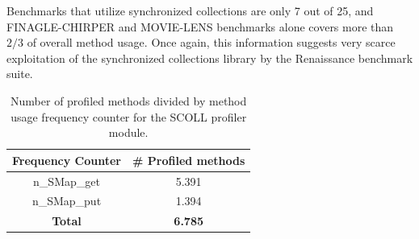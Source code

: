 \documentclass[]{usiinfthesis}
\begin{document}
 Benchmarks that utilize synchronized collections are only 7 out of 25, and FINAGLE-CHIRPER and MOVIE-LENS benchmarks alone covers more than \(2/3\) of overall method usage. Once again, this information suggests very scarce exploitation of the synchronized collections library by the Renaissance benchmark suite.
 
 
\begin{table}
\centering
\caption{Number of profiled methods divided by method usage frequency counter for the SCOLL profiler module.}
\begin{tabular}{|c|c|}
\hline
\textbf{Frequency Counter} & \textbf{# Profiled methods} \\
\hline
n\_SMap\_get	&	5.391	 \\ 
n\_SMap\_put	&	1.394	 \\ 
\hline			
\hline			
\textbf{Total}	&  \textbf{	6.785	 }\\ 
\hline			
\end{tabular}
\end{table}%

\end{document}
